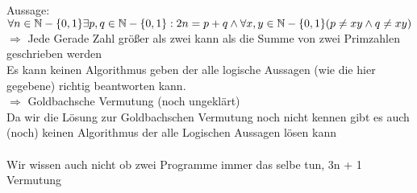 \documentclass{article}
\begin{document}
Aussage: \\
$
    \forall n \in \mathbb{N} - \{0, 1\} \exists p, q \in 
    \mathbb{N}-\{0, 1\}: \\
    2n = p +  q \land \forall x,y \in \mathbb{N} - \{0, 1\} (p \neq xy \land q \neq xy)
$
$\Rightarrow$ Jede Gerade Zahl größer als zwei kann als die Summe von zwei Primzahlen 
geschrieben werden \\
Es kann keinen Algorithmus geben der alle logische Aussagen (wie die hier gegebene) richtig
beantworten kann. \\
$\Rightarrow$ Goldbachsche Vermutung (noch ungeklärt) \\
Da wir die Lösung zur Goldbachschen Vermutung noch nicht kennen gibt es auch (noch) keinen 
Algorithmus der alle Logischen Aussagen lösen kann
\\
\\
Wir wissen auch nicht ob zwei Programme immer das selbe tun, 3n + 1 Vermutung
\end{document}
